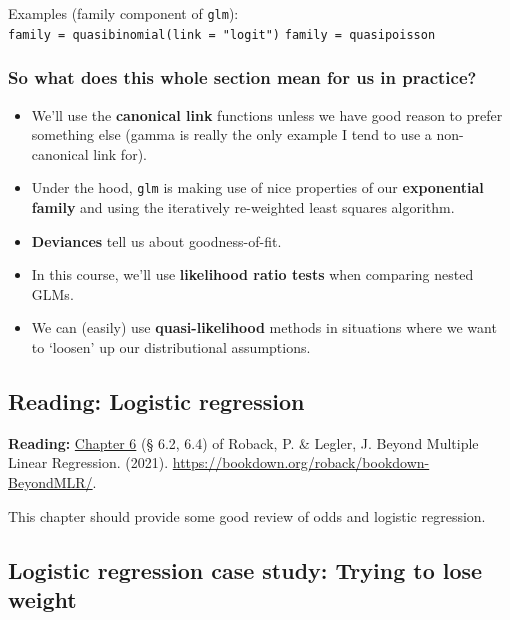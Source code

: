 \documentclass[
  openany]{book}
\providecommand{\tightlist}{%
  \setlength{\itemsep}{0pt}\setlength{\parskip}{0pt}}
\begin{document}
Examples (family component of \texttt{glm}):\\
\texttt{family\ =\ quasibinomial(link\ =\ "logit")} \texttt{family\ =\ quasipoisson}

\hypertarget{so-what-does-this-whole-section-mean-for-us-in-practice}{%
\subsubsection{So what does this whole section mean for us in practice?}\label{so-what-does-this-whole-section-mean-for-us-in-practice}}

\begin{itemize}
\tightlist
\item
  We'll use the \textbf{canonical link} functions unless we have good
  reason to prefer something else (gamma is really the only example I
  tend to use a non-canonical link for).
\item
  Under the hood, \texttt{glm} is making use of nice properties of our
  \textbf{exponential family} and using the iteratively re-weighted least
  squares algorithm.
\item
  \textbf{Deviances} tell us about goodness-of-fit.
\item
  In this course, we'll use \textbf{likelihood ratio tests} when comparing
  nested GLMs.
\item
  We can (easily) use \textbf{quasi-likelihood} methods in situations where
  we want to `loosen' up our distributional assumptions.
\end{itemize}

\hypertarget{reading-logistic-regression}{%
\subsection{Reading: Logistic regression}\label{reading-logistic-regression}}

\textbf{Reading:} \href{https://bookdown.org/roback/bookdown-BeyondMLR/ch-logreg.html}{Chapter
6} (§
6.2, 6.4) of Roback, P. \& Legler, J. Beyond Multiple Linear Regression.
(2021). \url{https://bookdown.org/roback/bookdown-BeyondMLR/}.

This chapter should provide some good review of odds and logistic
regression.

\hypertarget{logistic-regression-case-study-trying-to-lose-weight}{%
\subsection{Logistic regression case study: Trying to lose weight}\label{logistic-regression-case-study-trying-to-lose-weight}}
\end{document}
